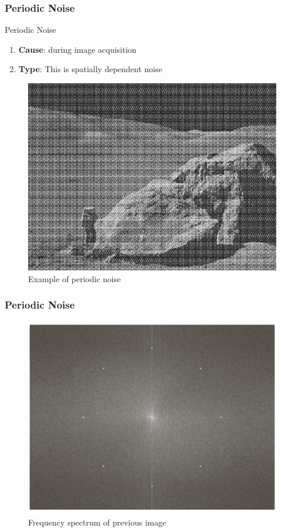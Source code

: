 \documentclass[english,11pt,table,handout]{beamer}
\begin{document}
\frame
{
	\frametitle{Periodic Noise}
	
	\begin{alertblock}{Periodic Noise}
		\begin{enumerate}
			\item \textbf{Cause}: during image acquisition
			\item \textbf{Type}: This is spatially dependent noise
		\end{enumerate}
	\end{alertblock}
	\begin{example}
		\begin{figure}[!h]
			\includegraphics[scale=0.25]{periodic_noise_image.jpg}
			\caption{Example of periodic noise}
			\label{fig:periodic}
		\end{figure}
	\end{example}
}
\frame
{
	\frametitle{Periodic Noise}

	\begin{example}
		\begin{figure}[!h]
			\includegraphics[scale=0.8]{periodic_freq.png}
			\caption{Frequency spectrum of previous image}
			\label{fig:periodic}
		\end{figure}
	\end{example}
}
\end{document}
